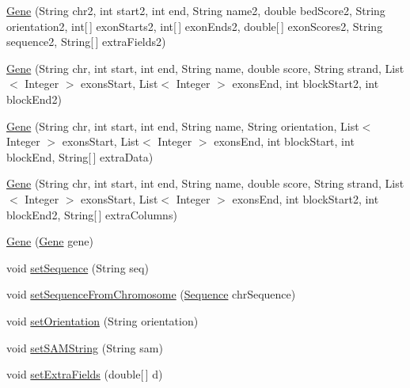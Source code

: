 \begin{DoxyCompactItemize}
\item 
\hyperlink{classumms_1_1core_1_1annotation_1_1_gene_a50b6963ef5a1fbc4909bdefab09582d3}{Gene} (String chr2, int start2, int end, String name2, double bed\+Score2, String orientation2, int\mbox{[}$\,$\mbox{]} exon\+Starts2, int\mbox{[}$\,$\mbox{]} exon\+Ends2, double\mbox{[}$\,$\mbox{]} exon\+Scores2, String sequence2, String\mbox{[}$\,$\mbox{]} extra\+Fields2)
\item 
\hyperlink{classumms_1_1core_1_1annotation_1_1_gene_a43a4752f8a05d00c9c05b07d8f8b42b1}{Gene} (String chr, int start, int end, String name, double score, String strand, List$<$ Integer $>$ exons\+Start, List$<$ Integer $>$ exons\+End, int block\+Start2, int block\+End2)
\item 
\hyperlink{classumms_1_1core_1_1annotation_1_1_gene_adf81fd7f1f06cef900500cad23f39579}{Gene} (String chr, int start, int end, String name, String orientation, List$<$ Integer $>$ exons\+Start, List$<$ Integer $>$ exons\+End, int block\+Start, int block\+End, String\mbox{[}$\,$\mbox{]} extra\+Data)
\item 
\hyperlink{classumms_1_1core_1_1annotation_1_1_gene_a026bd7bfbea2ca82b397b701c7abc56d}{Gene} (String chr, int start, int end, String name, double score, String strand, List$<$ Integer $>$ exons\+Start, List$<$ Integer $>$ exons\+End, int block\+Start2, int block\+End2, String\mbox{[}$\,$\mbox{]} extra\+Columns)
\item 
\hyperlink{classumms_1_1core_1_1annotation_1_1_gene_a7fcfa09e18d2f3c96d25f92118873cb0}{Gene} (\hyperlink{classumms_1_1core_1_1annotation_1_1_gene}{Gene} gene)
\item 
void \hyperlink{classumms_1_1core_1_1annotation_1_1_gene_a7976c9be5a3293b44ce54332610f5092}{set\+Sequence} (String seq)
\item 
void \hyperlink{classumms_1_1core_1_1annotation_1_1_gene_a40aea7af10672b2b9c85a29ecaca3dad}{set\+Sequence\+From\+Chromosome} (\hyperlink{classbroad_1_1core_1_1sequence_1_1_sequence}{Sequence} chr\+Sequence)
\item 
void \hyperlink{classumms_1_1core_1_1annotation_1_1_gene_ae8eb345ba7a1f4e7d15b0fcd8dea258d}{set\+Orientation} (String orientation)
\item 
void \hyperlink{classumms_1_1core_1_1annotation_1_1_gene_ae08977025f74d398eeecb897efad27f1}{set\+S\+A\+M\+String} (String sam)
\item 
void \hyperlink{classumms_1_1core_1_1annotation_1_1_gene_a1c88dd4db6a2ad407ff3358344dacd36}{set\+Extra\+Fields} (double\mbox{[}$\,$\mbox{]} d)

\end{DoxyCompactItemize}
